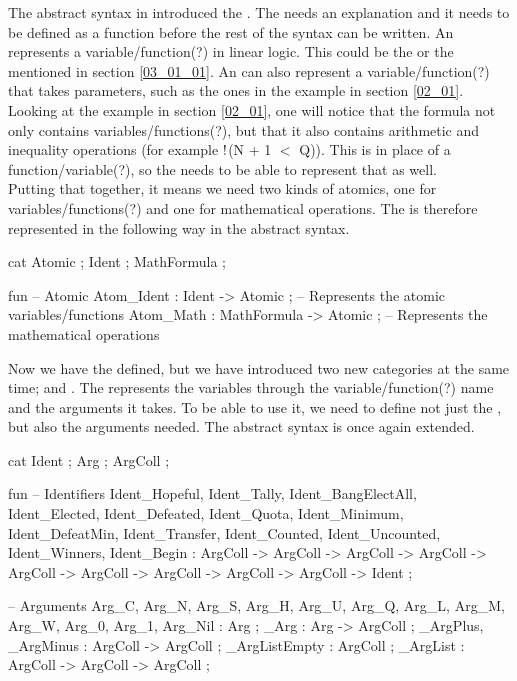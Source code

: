 The abstract syntax in  introduced the . The  needs an explanation and it needs to be defined as a function before the rest of the syntax can be written. An  represents a variable/function(?) in linear logic. This could be the  or the  mentioned in section \ref{03_01_01}. An  can also represent a variable/function(?) that takes parameters, such as the ones in the example in section \ref{02_01}. \\
Looking at the example in section \ref{02_01}, one will notice that the formula not only contains variables/functions(?), but that it also contains arithmetic and inequality operations (for example  $\mathord{\text{\rm !}}$(N + 1 $<$ Q)). This is in place of a function/variable(?), so the  needs to be able to represent that as well. \\
Putting that together, it means we need two kinds of atomics, one for variables/functions(?) and one for mathematical operations. The  is therefore represented in the following way in the abstract syntax.

\begin{lstgf}
    cat
        Atomic ; Ident ; MathFormula ;

    fun
        -- Atomic
        Atom_Ident : Ident -> Atomic ;          -- Represents the atomic variables/functions
        Atom_Math : MathFormula -> Atomic ;     -- Represents the mathematical operations
\end{lstgf}

Now we have the  defined, but we have introduced two new categories at the same time;  and . The  represents the variables through the variable/function(?) name and the arguments it takes. To be able to use it, we need to define not just the , but also the arguments needed. The abstract syntax is once again extended.

\begin{lstgf}
    cat
        Ident ; Arg ; ArgColl ;

    fun
        -- Identifiers
        Ident_Hopeful, Ident_Tally, Ident_BangElectAll, Ident_Elected, Ident_Defeated, Ident_Quota, Ident_Minimum,
        Ident_DefeatMin, Ident_Transfer, Ident_Counted, Ident_Uncounted, Ident_Winners, Ident_Begin : ArgColl ->
        ArgColl -> ArgColl -> ArgColl -> ArgColl -> ArgColl -> ArgColl -> ArgColl -> ArgColl -> Ident ;
        
        -- Arguments
        Arg_C, Arg_N, Arg_S, Arg_H, Arg_U, Arg_Q, Arg_L, Arg_M, Arg_W, Arg_0, Arg_1, Arg_Nil : Arg ;
        _Arg : Arg -> ArgColl ;
        _ArgPlus, _ArgMinus : ArgColl -> ArgColl ;
        _ArgListEmpty : ArgColl ;
        _ArgList : ArgColl -> ArgColl ->  ArgColl ;
\end{lstgf}

